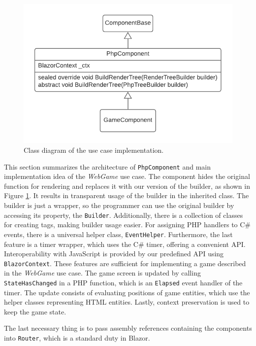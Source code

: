 \begin{figure}[t!]
\centering
\includegraphics[scale=0.8]{./img/PhpComponentSolution}
\caption{Class diagram of the use case implementation.}
\label{img17:solution}
\end{figure}
\par
This section summarizes the architecture of \texttt{PhpComponent} and main implementation idea of the \textit{WebGame} use case.
The component hides the original function for rendering and replaces it with our version of the builder, as shown in Figure \ref{img17:solution}.
It results in transparent usage of the builder in the inherited class.
The builder is just a wrapper, so the programmer can use the original builder by accessing its property, the \texttt{Builder}.
Additionally, there is a collection of classes for creating tags, making builder usage easier.
For assigning PHP handlers to C\# events, there is a universal helper class, \texttt{EventHelper}.
Furthermore, the last feature is a timer wrapper, which uses the C\# timer, offering a convenient API.
Interoperability with JavaScript is provided by our predefined API using \texttt{BlazorContext}.
These features are sufficient for implementing a game described in the \textit{WebGame} use case.
The game screen is updated by calling \texttt{StateHasChanged} in a PHP function, which is an \texttt{Elapsed} event handler of the timer. 
The update consists of evaluating positions of game entities, which use the helper classes representing HTML entities.
Lastly, context preservation is used to keep the game state.
\par
The last necessary thing is to pass assembly references containing the components into \texttt{Router}, which is a standard duty in Blazor.

